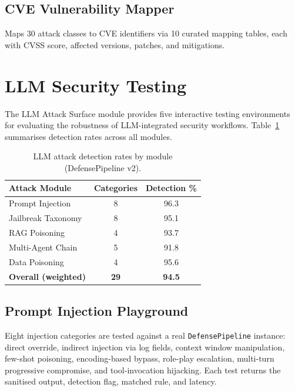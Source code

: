 \documentclass[11pt,a4paper]{article}
\begin{document}
\subsection{CVE Vulnerability Mapper}
\label{sec:cve_mapper}

Maps 30 attack classes to CVE identifiers via 10 curated mapping tables, each with CVSS score, affected versions, patches, and mitigations.

\section{LLM Security Testing}
\label{sec:llm_security}

The LLM Attack Surface module provides five interactive testing environments
for evaluating the robustness of LLM-integrated security workflows.
Table~\ref{tab:llm_detection} summarises detection rates across all modules.

\begin{table}[t]
\centering
\caption{LLM attack detection rates by module (DefensePipeline v2).}
\label{tab:llm_detection}
\begin{tabular}{@{}lcc@{}}
\toprule
\textbf{Attack Module} & \textbf{Categories} & \textbf{Detection \%} \\
\midrule
Prompt Injection        & 8  & 96.3 \\
Jailbreak Taxonomy      & 8  & 95.1 \\
RAG Poisoning           & 4  & 93.7 \\
Multi-Agent Chain       & 5  & 91.8 \\
Data Poisoning          & 4  & 95.6 \\
\midrule
\textbf{Overall (weighted)} & \textbf{29} & \textbf{94.5} \\
\bottomrule
\end{tabular}
\end{table}

\subsection{Prompt Injection Playground}
Eight injection categories are tested against a real \texttt{DefensePipeline}
instance: direct override, indirect injection via log fields, context window
manipulation, few-shot poisoning, encoding-based bypass, role-play escalation,
multi-turn progressive compromise, and tool-invocation hijacking.  Each test
returns the sanitised output, detection flag, matched rule, and latency.
\end{document}
